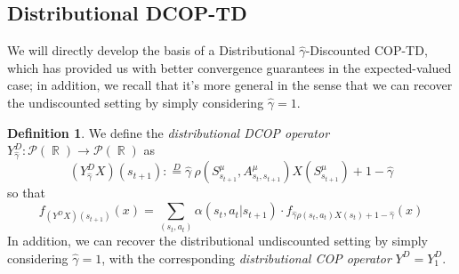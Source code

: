 \documentclass[12pt,a4paper,openright,twoside]{article}
\DeclareMathOperator*{\E}{\mathbb{E}}
\DeclareMathOperator*{\R}{\mathbb{R}}
\numberwithin{equation}{section}
\theoremstyle{definition}
\newtheorem{definition}{Definition}
\theoremstyle{remark}
\theoremstyle{plain}
\begin{document}

\subsection{Distributional DCOP-TD}

We will directly develop the basis of a Distributional $\hat{\gamma}$-Discounted COP-TD, which has provided us with better convergence guarantees in the expected-valued case; in addition, we recall that it's more general in the sense that we can recover the undiscounted setting by simply considering $\hat{\gamma}=1$.

\begin{definition} \label{defDistCOPoperator}
	We define the \textit{distributional DCOP operator} $Y^D_{\hat{\gamma}}: \mathscr{P}(\R) \rightarrow \mathscr{P}(\R)$ as 
	\begin{equation*}
		(Y^D_{\hat{\gamma}} X)(s_{t+1}) :\stackrel{D}{=} \hat{\gamma} \ \rho(S^{\mu}_{s_{t+1}},A^{\mu}_{s_{t},s_{t+1}}) X(S^{\mu}_{s_{t+1}}) + 1 -\hat{\gamma}
	\end{equation*}
	so that 
	\begin{equation*}
		f_{(Y^D X)(s_{t+1})}(x) = \sum_{(s_{t},a_{t})} \alpha(s_{t},a_{t}|s_{t+1}) \cdot f_{\hat{\gamma}\rho(s_{t},a_{t}) X(s_{t}) +1 - \hat{\gamma}}(x)
	\end{equation*}
	In addition, we can recover the distributional undiscounted setting by simply considering $\hat{\gamma}=1$, with the corresponding \textit{distributional COP operator} $Y^D = Y_1^D$.
\end{definition}
\end{document}
